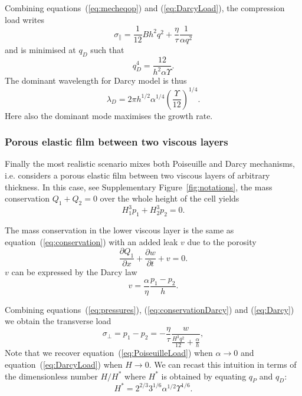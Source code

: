 \documentclass[twocolumn,superscriptaddress,showpacs,preprintnumbers,
amsmath,amssymb,prl]{revtex4-1}
\begin{document}
Combining equations~(\ref{eq:mecheqop}) and (\ref{eq:DarcyLoad}), the compression load writes
\begin{equation}
\sigma_\parallel = \frac{1}{12}B h^2 q^2 + \frac{\eta}{\tau}\frac{1}{\alpha q^2}
\label{eq:sigma0D}
\end{equation}
and is minimised at $q_D$ such that
\begin{equation}
q_D^4 = \frac{12}{h^2\alpha\Upsilon}.
\label{eq:qD}
\end{equation}
%
The dominant wavelength for Darcy model is thus
\begin{equation}
\lambda_D = 2\pi h^{1/2}\alpha^{1/4}\left(\frac{\Upsilon}{12}\right)^{1/4}.
\end{equation}
Here also the dominant mode maximises the growth rate.


\subsubsection*{Porous elastic film between two viscous layers}
Finally the most realistic scenario mixes both Poiseuille and Darcy mechanisms, i.e. considers a porous elastic film between two viscous layers of arbitrary thickness. In this case, see Supplementary Figure~\ref{fig:notations}, the mass conservation $Q_1 + Q_2 = 0$ over the whole height of the cell yields
\begin{equation}
H_1^3 p_1 + H_2^3 p_2 = 0.
\label{eq:pressures}
\end{equation}

The mass conservation in the lower viscous layer is the same as equation~(\ref{eq:conservation}) with an added leak $v$ due to the porosity
\begin{equation}
\frac{\partial Q_1}{\partial x} + \frac{\partial w}{\partial t} + v = 0.
\label{eq:conservationDarcy}
\end{equation}
%
$v$ can be expressed by the Darcy law
\begin{equation}
v = \frac{\alpha}{\eta} \frac{p_1-p_2}{h}.
\label{eq:Darcy}
\end{equation}

Combining equations~(\ref{eq:pressures}), (\ref{eq:conservationDarcy}) and (\ref{eq:Darcy}) we obtain the transverse load
\begin{equation}
\sigma_\perp = p_1-p_2 = - \frac{\eta}{\tau} \frac{w}{\frac{H^3 q^2}{12} + \frac{\alpha}{h}},
\label{eq:MixtLoad}
\end{equation}
%
Note that we recover equation~(\ref{eq:PoiseuilleLoad}) when $\alpha \rightarrow 0$ and equation~(\ref{eq:DarcyLoad}) when $H \rightarrow 0$. We can recast this intuition in terms of the dimensionless number $H/H^*$ where $H^*$ is obtained by equating $q_P$ and $q_D$:
\begin{equation}
H^* = 2^{2/3} 3^{1/6} \alpha^{1/2} \Upsilon^{1/6}.
\end{equation}
\end{document}
